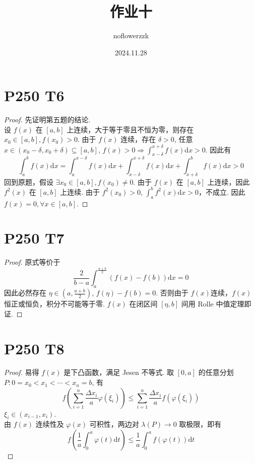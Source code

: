 \documentclass{article}
\title{作业十}
\author{noflowerzzk}
\date{2024.11.28}
\newcommand{\dd}{\mathrm{d}}
\newcommand{\dx}{\dd x}
\begin{document}
\maketitle

\section*{P250 T6}

\begin{proof}
    先证明第五题的结论. \\
    设 $f(x)$ 在 $[a, b]$ 上连续，大于等于零且不恒为零，则存在 $x_0 \in [a, b], f(x_0) > 0$. 由于 $f(x)$ 连续，存在 $\delta > 0$, 任意 $x \in (x_0 - \delta, x_0 + \delta) \subseteq [a, b]$, $f(x) > 0 \Rightarrow \int_{x - \delta}^{x + \delta}f(x) \dx > 0$. 因此有
    \[
        \int_a^b f(x) \dx = \int_a^{x - \delta} f(x) \dx + \int_{x - \delta}^{x + \delta}f(x) \dx + \int_{x + \delta}^b f(x) \dx > 0
    \]
    回到原题，假设 $\exists x_0 \in [a, b], f(x_0) \neq 0$. 由于 $f(x)$ 在 $[a, b]$ 上连续，因此 $f^2(x)$ 在 $[a, b]$ 上连续. 由于 $f^2(x_0) > 0$, $\int_a^b f^2(x) \dx > 0$，不成立. 因此 $f(x) = 0, \forall x \in [a, b]$. 
\end{proof}

\section*{P250 T7}

\begin{proof}
    原式等价于
    \[
        \frac{2}{b - a}\int_a^{\frac{a + b}{2}}\left(f(x) - f(b)\right)\dx = 0
    \]
    因此必然存在 $\eta \in \left(a, \frac{a + b }{2}\right)$, $f(\eta) - f(b) = 0$. 否则由于 $f(x)$连续，$f(x)$ 恒正或恒负，积分不可能等于零. $f(x)$ 在闭区间 $[\eta, b]$ 间用 Rolle 中值定理即证. 
\end{proof}

\section*{P250 T8}

\begin{proof}
    易得 $f(x)$ 是下凸函数，满足 Jesen 不等式. 取 $[0, a]$ 的任意分划 $P: 0 = x_0 < x_1 < \cdots < x_n = b$, 有
    \[
        f\left(\sum_{i = 1}^n \frac{\Delta x_i}{a}\varphi(\xi_i)\right) \leqslant \sum_{i = 1}^n\frac{\Delta x_i}{a}f(\varphi(\xi_i))
    \] $\xi_i \in (x_{i - 1}, x_i)$. \\
    由 $f(x)$ 连续性及 $\varphi(x)$ 可积性，两边对 $\lambda(P) \to 0$ 取极限，即有
    \[
        f\left(\frac{1}{a}\int_{0}^{a}\varphi(t)\dd t\right) \leqslant \frac{1}{a}\int_{0}^{a}f(\varphi(t))\dd t
    \]
\end{proof}
\end{document}

